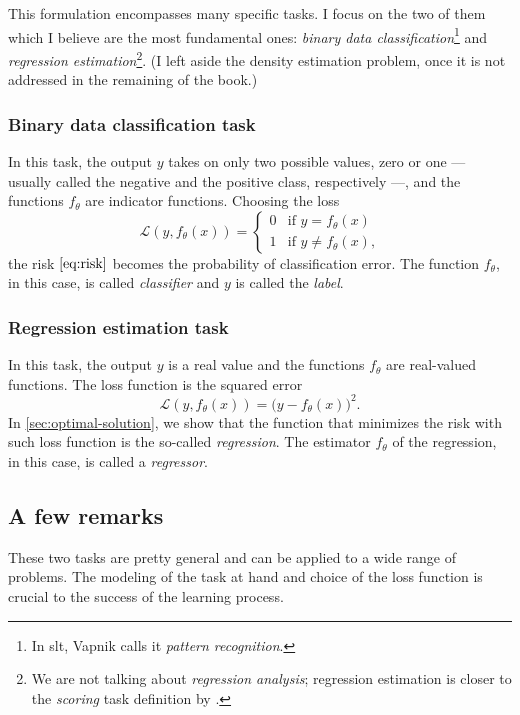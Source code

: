 This formulation encompasses many specific tasks. I focus on the two of them which I
believe are the most fundamental ones: \emph{binary data classification}\footnote{In
\gls{slt}, Vapnik calls it \emph{pattern recognition}.} and \emph{regression
estimation}\footnote{We are not talking about \emph{regression analysis}; regression
estimation is closer to the \emph{scoring} task definition by .}.  (I
left aside the density estimation problem, once it is not addressed in the remaining of
the book.)

\subsubsection{Binary data classification task}

In this task, the output $y$ takes on
only two possible values, zero or one --- usually called the negative and the positive
class, respectively ---, and the functions $f_\theta$ are indicator
functions. Choosing the loss
\begin{equation*}
  \mathcal{L}(y, f_\theta(x)) = \begin{cases}
    0 & \text{if } y = f_\theta(x) \\
    1 & \text{if } y \neq f_\theta(x)\text{,}
  \end{cases}
\end{equation*}
the risk $\eqref{eq:risk}$ becomes the probability of
classification error.  The function $f_\theta$, in this case, is called \emph{classifier}
and $y$ is called the \emph{label}.

\subsubsection{Regression estimation task}

In this task, the output $y$ is a real value and the functions $f_\theta$ are real-valued
functions.  The loss function is the squared error
\[
  \mathcal{L}(y, f_\theta(x)) = \big(y - f_\theta(x)\big)^2\text{.}
\]
In \cref{sec:optimal-solution}, we show that the function that minimizes the risk with such
loss function is the so-called \emph{regression}.
The estimator $f_\theta$ of the regression, in this case, is called a \emph{regressor}.

\subsection{A few remarks}

These two tasks are pretty general and can be applied to a wide range of problems.  The
modeling of the task at hand and choice of the loss function is crucial to the success of
the learning process.

